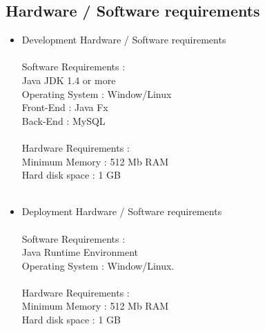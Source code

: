 		\subsection{Hardware / Software requirements}
		\begin{itemize}
		
		
		\item Development Hardware / Software requirements \\\\
		Software Requirements : \\
		Java  JDK 1.4 or more \\
		Operating System : Window/Linux\\
		Front-End : Java Fx\\
		Back-End : MySQL\\\\
		Hardware Requirements :\\
		Minimum Memory : 512 Mb RAM \\
		Hard disk space : 1 GB\\\\
		
		
		\item Deployment Hardware / Software requirements \\\\
		Software Requirements : \\
		Java Runtime Environment\\
		Operating System : Window/Linux. \\\\
		Hardware Requirements : \\
		Minimum Memory : 512 Mb RAM \\
		Hard disk space : 1 GB\\
		\end{itemize}
